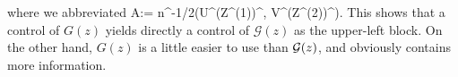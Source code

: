  where we abbreviated
 \be\label{abbr_A}
 A:= n^{-1/2}(\Lambda U^\top (Z^{(1)})^\top, V^\top (Z^{(2)})^\top).
 \ee
 This shows that a control of $G(z)$ yields directly a control of $\mathcal G(z)$ as the upper-left block. On the other hand, $G(z)$ is a little  easier to use than $\cal G(z)$, and obviously contains more information.



